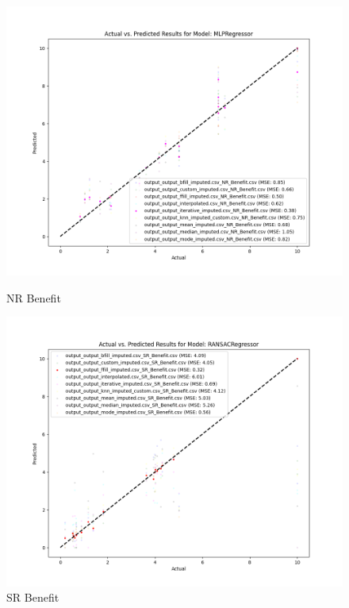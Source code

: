 \begin{figure}[H]
    \centering
    \begin{minipage}{0.495\textwidth}
        \centering
        \includegraphics[width=\linewidth]{reg_section_all/images_reg_training/NR_Benefit_MLPRegressor_plot.png}
        \caption{NR Benefit}
        \label{fig:nr_ben_reg_training}
    \end{minipage}\hfill
    \begin{minipage}{0.495\textwidth}
        \centering
        \includegraphics[width=\linewidth]{reg_section_all/images_reg_training/SR_Benefit_RANSACRegressor_plot.png}
        \caption{SR Benefit}
        \label{fig:sr_ben_reg_training}
    \end{minipage}
\end{figure}

